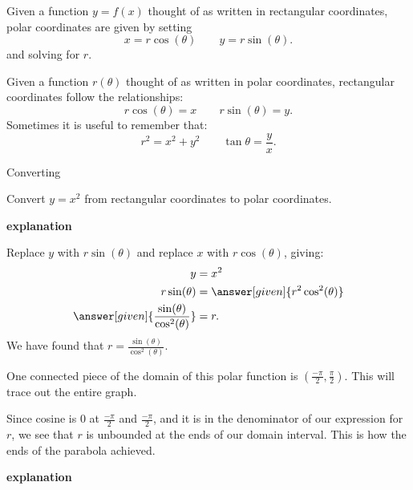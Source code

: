 \documentclass{ximera}
\begin{document}
Given a function $y=f(x)$ thought of as written in rectangular coordinates, polar coordinates
are given by setting
\[
x=r\cos(\theta)\qquad y=r\sin(\theta).
\]
and solving for $r$.

Given a function $r(\theta)$ thought of as written in polar coordinates, rectangular
coordinates follow the relationships:
\[
r\cos(\theta) = x\qquad r\sin(\theta) = y.
\]
Sometimes it is useful to remember that:
\[
r^2=x^2+y^2\qquad \tan \theta = \frac yx.
\]


\begin{example} Converting 

  Convert $y=x^2$ from rectangular coordinates to polar coordinates.

\textbf{\textcolor{red!75!green}{explanation}} 

    Replace $y$ with $r\sin(\theta)$ and replace $x$ with $r\cos(\theta)$, giving:
      \begin{align*}
	y &=x^2\\
	r\sin(\theta) &= \answer[given]{r^2\cos^2(\theta)}\\
	\answer[given]{\frac{\sin(\theta)}{\cos^2(\theta)}}  &= r.
      \end{align*}
      We have found that $r=\frac{\sin(\theta)}{\cos^2(\theta)}$. 

      One connected piece of the domain of this polar function is $\left( \frac{-\pi}{2}, \frac{\pi}{2} \right)$. This will trace out the entire graph.




      Since cosine is $0$ at $\frac{-\pi}{2}$ and $\frac{-\pi}{2}$, and it is in the denominator of our expression for $r$, we see that $r$ is unbounded at the ends of our domain interval.  This is how the ends of the parabola achieved.



\textbf{\textcolor{red!75!green}{explanation}} 





\begin{center}
\end{center}



\end{example}
\end{document}
